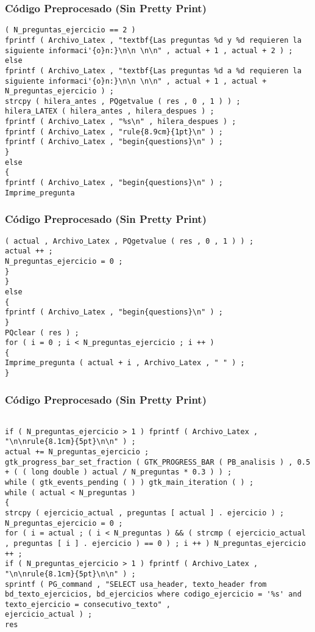 \documentclass{beamer}
\begin{document}
\begin{frame}[fragile]
\frametitle{C\'odigo Preprocesado (Sin Pretty Print)}
\begin{lstlisting}[style=CStyle]
( N_preguntas_ejercicio == 2 ) 
fprintf ( Archivo_Latex , "textbf{Las preguntas %d y %d requieren la siguiente informaci'{o}n:}\n\n \n\n" , actual + 1 , actual + 2 ) ; 
else 
fprintf ( Archivo_Latex , "textbf{Las preguntas %d a %d requieren la siguiente informaci'{o}n:}\n\n \n\n" , actual + 1 , actual + N_preguntas_ejercicio ) ; 
strcpy ( hilera_antes , PQgetvalue ( res , 0 , 1 ) ) ; 
hilera_LATEX ( hilera_antes , hilera_despues ) ; 
fprintf ( Archivo_Latex , "%s\n" , hilera_despues ) ; 
fprintf ( Archivo_Latex , "rule{8.9cm}{1pt}\n" ) ; 
fprintf ( Archivo_Latex , "begin{questions}\n" ) ; 
} 
else 
{ 
fprintf ( Archivo_Latex , "begin{questions}\n" ) ; 
Imprime_pregunta \end{lstlisting}
\end{frame}
\begin{frame}[fragile]
\frametitle{C\'odigo Preprocesado (Sin Pretty Print)}
\begin{lstlisting}[style=CStyle]
( actual , Archivo_Latex , PQgetvalue ( res , 0 , 1 ) ) ; 
actual ++ ; 
N_preguntas_ejercicio = 0 ; 
} 
} 
else 
{ 
fprintf ( Archivo_Latex , "begin{questions}\n" ) ; 
} 
PQclear ( res ) ; 
for ( i = 0 ; i < N_preguntas_ejercicio ; i ++ ) 
{ 
Imprime_pregunta ( actual + i , Archivo_Latex , " " ) ; 
} \end{lstlisting}
\end{frame}
\begin{frame}[fragile]
\frametitle{C\'odigo Preprocesado (Sin Pretty Print)}
\begin{lstlisting}[style=CStyle]

if ( N_preguntas_ejercicio > 1 ) fprintf ( Archivo_Latex , "\n\nrule{8.1cm}{5pt}\n\n" ) ; 
actual += N_preguntas_ejercicio ; 
gtk_progress_bar_set_fraction ( GTK_PROGRESS_BAR ( PB_analisis ) , 0.5 + ( ( long double ) actual / N_preguntas * 0.3 ) ) ; 
while ( gtk_events_pending ( ) ) gtk_main_iteration ( ) ; 
while ( actual < N_preguntas ) 
{ 
strcpy ( ejercicio_actual , preguntas [ actual ] . ejercicio ) ; 
N_preguntas_ejercicio = 0 ; 
for ( i = actual ; ( i < N_preguntas ) && ( strcmp ( ejercicio_actual , preguntas [ i ] . ejercicio ) == 0 ) ; i ++ ) N_preguntas_ejercicio ++ ; 
if ( N_preguntas_ejercicio > 1 ) fprintf ( Archivo_Latex , "\n\nrule{8.1cm}{5pt}\n\n" ) ; 
sprintf ( PG_command , "SELECT usa_header, texto_header from bd_texto_ejercicios, bd_ejercicios where codigo_ejercicio = '%s' and texto_ejercicio = consecutivo_texto" , 
ejercicio_actual ) ; 
res \end{lstlisting}
\end{frame}
\end{document}
